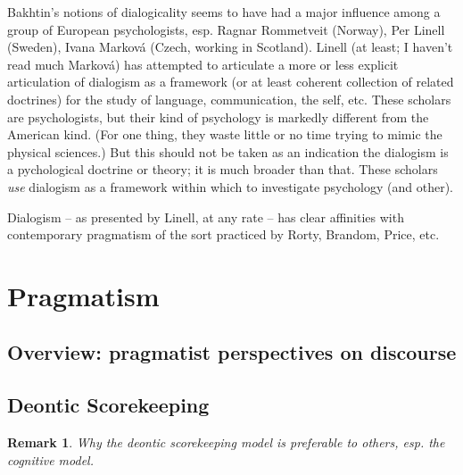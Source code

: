 \documentclass[11pt,twoside]{article}
\newtheorem{remark}{Remark}
\begin{document}
Bakhtin's notions of dialogicality seems to have had a major influence
among a group of European psychologists, esp. Ragnar Rommetveit
(Norway), Per Linell (Sweden), Ivana Marková (Czech, working in
Scotland).  Linell (at least; I haven't read much Marková) has
attempted to articulate a more or less explicit articulation of
dialogism as a framework (or at least coherent collection of related
doctrines) for the study of language, communication, the self, etc.
These scholars are psychologists, but their kind of psychology is
markedly different from the American kind.  (For one thing, they waste
little or no time trying to mimic the physical sciences.)  But this
should not be taken as an indication the dialogism is a pychological
doctrine or theory; it is much broader than that.  These scholars
\textit{use} dialogism as a framework within which to investigate
psychology (and other).

Dialogism -- as presented by Linell, at any rate -- has clear
affinities with contemporary pragmatism of the sort practiced by
Rorty, Brandom, Price, etc.

\cite{linell_respect_2009}

\cite{linell_rethinking_2009}

\cite{markova_coding_2007}

\cite{linell_communicative_2010}

\cite{linell_asymmetries_1991}

\section{Pragmatism}

\subsection{Overview: pragmatist perspectives on discourse}

\subsection{Deontic Scorekeeping}

\begin{abstract}

\end{abstract}


\begin{remark}
Why the deontic scorekeeping model is preferable to others, esp. the
cognitive model.
\end{remark}
\end{document}
